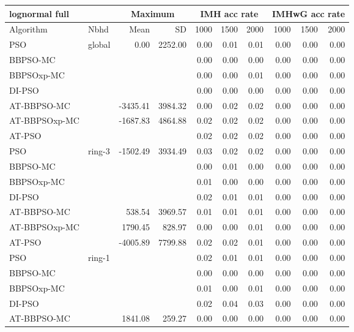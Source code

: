 \documentclass[12pt]{article}
\begin{document}
\begin{table}[h]
\centering
\tiny{
\begin{tabular}{llrr|rrr|rrr}
\multicolumn{2}{l}{lognormal full}& \multicolumn{2}{c}{Maximum} & \multicolumn{3}{c}{IMH acc rate}  &\multicolumn{3}{c}{IMHwG acc rate}\\
  \hline 
Algorithm & Nbhd & Mean & SD & 1000 & 1500 & 2000 & 1000 & 1500 & 2000 \\ 
  \hline
PSO & global & 0.00 & 2252.00 & 0.00 & 0.01 & 0.01 & 0.00 & 0.00 & 0.00 \\ 
  BBPSO-MC &  &  &  & 0.00 & 0.00 & 0.00 & 0.00 & 0.00 & 0.00 \\ 
  BBPSOxp-MC &  &  &  & 0.00 & 0.00 & 0.01 & 0.00 & 0.00 & 0.00 \\ 
  DI-PSO &  &  &  & 0.00 & 0.00 & 0.00 & 0.00 & 0.00 & 0.00 \\ 
  AT-BBPSO-MC &  & -3435.41 & 3984.32 & 0.00 & 0.02 & 0.02 & 0.00 & 0.00 & 0.00 \\ 
  AT-BBPSOxp-MC &  & -1687.83 & 4864.88 & 0.02 & 0.02 & 0.02 & 0.00 & 0.00 & 0.00 \\ 
  AT-PSO &  &  &  & 0.02 & 0.02 & 0.02 & 0.00 & 0.00 & 0.00 \\ \hline
  PSO & ring-3 & -1502.49 & 3934.49 & 0.03 & 0.02 & 0.02 & 0.00 & 0.00 & 0.00 \\ 
  BBPSO-MC &  &  &  & 0.00 & 0.01 & 0.00 & 0.00 & 0.00 & 0.00 \\ 
  BBPSOxp-MC &  &  &  & 0.01 & 0.00 & 0.00 & 0.00 & 0.00 & 0.00 \\ 
  DI-PSO &  &  &  & 0.02 & 0.01 & 0.01 & 0.00 & 0.00 & 0.00 \\ 
  AT-BBPSO-MC &  & 538.54 & 3969.57 & 0.01 & 0.01 & 0.01 & 0.00 & 0.00 & 0.00 \\ 
  AT-BBPSOxp-MC &  & 1790.45 & 828.97 & 0.00 & 0.00 & 0.01 & 0.00 & 0.00 & 0.00 \\ 
  AT-PSO &  & -4005.89 & 7799.88 & 0.02 & 0.02 & 0.01 & 0.00 & 0.00 & 0.00 \\ \hline
  PSO & ring-1 &  &  & 0.02 & 0.01 & 0.01 & 0.00 & 0.00 & 0.00 \\ 
  BBPSO-MC &  &  &  & 0.00 & 0.00 & 0.00 & 0.00 & 0.00 & 0.00 \\ 
  BBPSOxp-MC &  &  &  & 0.01 & 0.00 & 0.01 & 0.00 & 0.00 & 0.00 \\ 
  DI-PSO &  &  &  & 0.02 & 0.04 & 0.03 & 0.00 & 0.00 & 0.00 \\ 
  AT-BBPSO-MC &  & 1841.08 & 259.27 & 0.00 & 0.00 & 0.00 & 0.00 & 0.00 & 0.00 \\ 

\end{tabular}}
\end{table}
\end{document}
